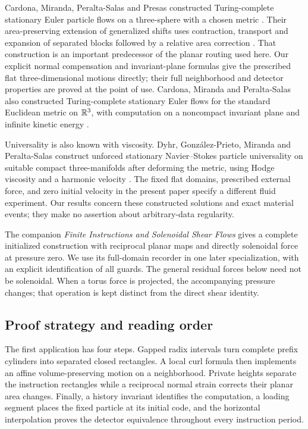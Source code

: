 Cardona, Miranda, Peralta-Salas and Presas constructed Turing-complete
stationary Euler particle flows on a three-sphere with a chosen metric
\cite{CardonaMirandaPeraltaSalasPresas2021}. Their area-preserving
extension of generalized shifts uses contraction, transport and expansion
of separated blocks followed by a relative area correction
\cite[Proposition~5.1]{CardonaMirandaPeraltaSalasPresas2021}.
That construction is an important predecessor of the planar routing used
here. Our explicit normal compensation and invariant-plane formulas give
the prescribed flat three-dimensional motions directly; their full
neighborhood and detector properties are proved at the point of use.
Cardona, Miranda and Peralta-Salas also constructed Turing-complete
stationary Euler flows for the standard Euclidean metric on $\mathbb R^3$,
with computation on a noncompact invariant plane and infinite kinetic
energy \cite[Theorem~1 and the discussion following it]{CardonaMirandaPeraltaSalas2023Beltrami}.

Universality is also known with viscosity. Dyhr, Gonz\'alez-Prieto, Miranda
and Peralta-Salas construct unforced stationary Navier--Stokes particle
universality on suitable compact three-manifolds after deforming the metric,
using Hodge viscosity and a harmonic velocity
\cite[Theorem~A]{DyhrGonzalezPrietoMirandaPeraltaSalas2026}.
The fixed flat domains, prescribed external force, and zero initial
velocity in the present paper specify a different fluid experiment.
Our results concern these constructed solutions and exact material events;
they make no assertion about arbitrary-data regularity.

The companion \emph{Finite Instructions and Solenoidal Shear Flows}
\cite{OpenAIShear2026} gives a complete initialized construction with
reciprocal planar maps and directly solenoidal force at pressure zero.
We use its full-domain recorder in one later specialization, with an
explicit identification of all guards. The general residual forces below
need not be solenoidal. When a torus force is projected, the accompanying
pressure changes; that operation is kept distinct from the direct shear
identity.

\subsection{Proof strategy and reading order}
The first application has four steps. Gapped radix intervals turn complete
prefix cylinders into separated closed rectangles. A local curl formula
then implements an affine volume-preserving motion on a neighborhood.
Private heights separate the instruction rectangles while a reciprocal
normal strain corrects their planar area changes. Finally, a history
invariant identifies the computation, a loading segment places the fixed
particle at its initial code, and the horizontal interpolation proves
the detector equivalence throughout every instruction period.

